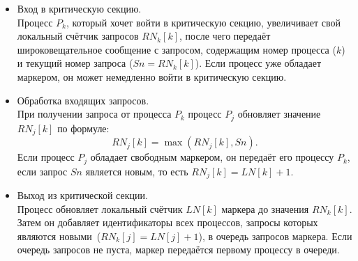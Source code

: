 \documentclass[openany, twoside, a4paper, 12pt]{extbook}
\begin{document}
\begin{itemize}
    \item Вход в критическую секцию.\\
    Процесс $P_k$, который хочет войти в критическую секцию,
	увеличивает свой локальный счётчик запросов $RN_k[k]$,
	после чего передаёт широковещательное сообщение с запросом,
	содержащим номер процесса ($k$) и текущий номер запроса ($Sn = RN_k[k]$).
	Если процесс уже обладает маркером, он может немедленно войти в критическую секцию.

    \item Обработка входящих запросов.\\
    При получении запроса от процесса $P_k$ процесс $P_j$ обновляет значение $RN_j[k]$ по формуле:
    \[
    RN_j[k] = \max(RN_j[k], Sn).
    \]
    Если процесс $P_j$ обладает свободным маркером, он передаёт его процессу $P_k$,
	если запрос $Sn$ является новым, то есть $RN_j[k] = LN[k] + 1$.

    \item Выход из критической секции.\\
    Процесс обновляет локальный счётчик $LN[k]$ маркера до значения $RN_k[k]$.
	Затем он добавляет идентификаторы всех процессов, запросы которых
	являются новыми~($RN_k[j] = LN[j] + 1$), в очередь запросов маркера.
	Если очередь запросов не пуста, маркер передаётся первому процессу в очереди.
\end{itemize}
\end{document}
